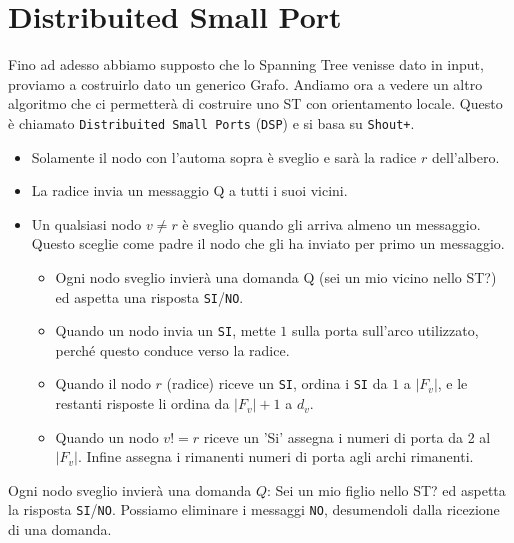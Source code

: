 \section{Distribuited Small Port}
Fino ad adesso abbiamo supposto che lo Spanning Tree venisse dato in input, proviamo a costruirlo dato un generico Grafo.
Andiamo ora a vedere un altro algoritmo che ci permetterà di costruire uno ST con orientamento locale. Questo è chiamato \texttt{Distribuited Small Ports} (\texttt{DSP}) e si basa su \texttt{Shout+}.
\begin{itemize}
    \item Solamente il nodo con l'automa sopra è sveglio e sarà la radice $r$ dell'albero.
    \item La radice invia un messaggio Q a tutti i suoi vicini.
    \item Un qualsiasi nodo $v \neq r$ è sveglio quando gli arriva almeno un messaggio. Questo sceglie come padre il nodo che gli ha inviato per primo un messaggio.
    \begin{itemize}
        \item Ogni nodo sveglio invierà una domanda Q (sei un mio vicino nello ST?) ed aspetta una risposta \texttt{SI}/\texttt{NO}.
        \item Quando un nodo invia un \texttt{SI}, mette $1$ sulla porta sull'arco utilizzato, perché questo conduce verso la radice.
        \item Quando il nodo $r$ (radice) riceve un \texttt{SI}, ordina i \texttt{SI} da $1$ a $|F_v|$, e le restanti risposte li ordina da $|F_v|+1$ a $d_v$.
        \item Quando un nodo $v != r$ riceve un 'Si' assegna i numeri di porta da 2 al $|F_v|$. Infine assegna i rimanenti numeri di porta agli archi rimanenti.
    \end{itemize}
\end{itemize}

Ogni nodo sveglio invierà una domanda $Q$: Sei un mio figlio nello ST? ed aspetta la risposta \texttt{SI}/\texttt{NO}. Possiamo eliminare i messaggi \texttt{NO}, desumendoli dalla ricezione di una domanda.


